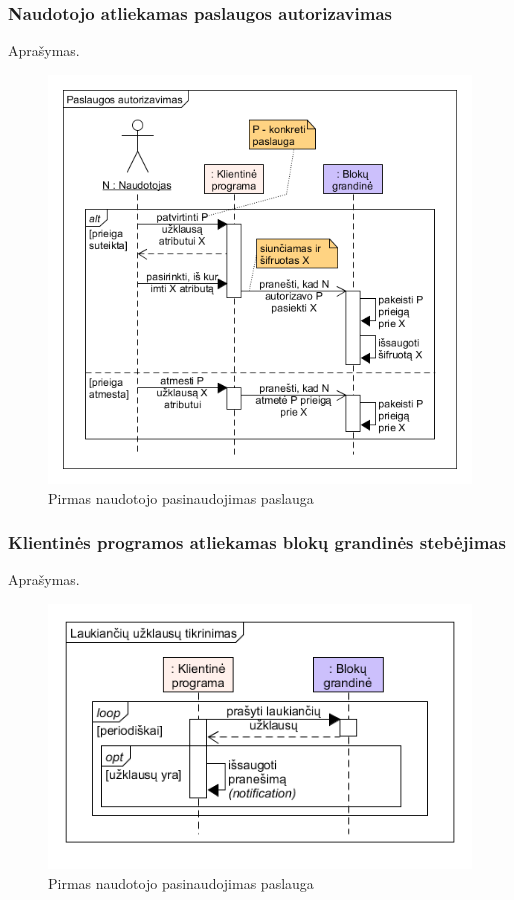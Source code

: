 \subsubsection{Naudotojo atliekamas paslaugos autorizavimas}

Aprašymas.

\begin{figure}[H]
    \centering
    \includegraphics[scale=0.8]{img/givePermissions}
    \caption{Pirmas naudotojo pasinaudojimas paslauga}
    \label{fig:givePermissions}
\end{figure}

\subsubsection{Klientinės programos atliekamas blokų grandinės stebėjimas}

Aprašymas.

\begin{figure}[H]
    \centering
    \includegraphics[scale=0.8]{img/checkForPendingPermissions}
    \caption{Pirmas naudotojo pasinaudojimas paslauga}
    \label{fig:checkForPendingPermissions}
\end{figure}